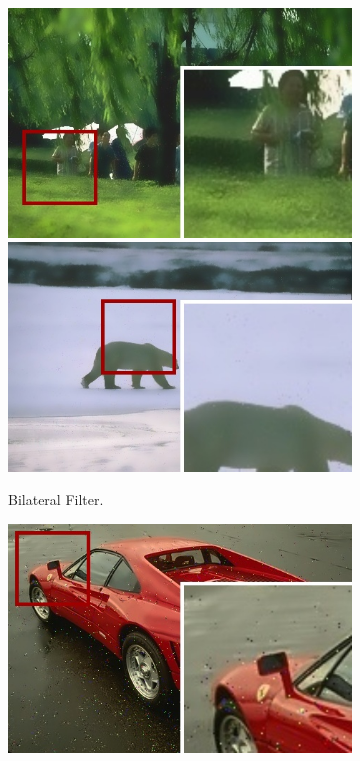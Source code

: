 \begin{figure}[!ht]
\begin{subfigure}[]{0.22\textwidth}
    \includegraphics[width=\textwidth]{./figures/sensor/berkeley/65033_bilateral_frame.jpg}\vspace{0.1cm}\\
    \includegraphics[width=\textwidth]{./figures/sensor/berkeley/100007_bilateral_frame.jpg}%
    \caption{Bilateral Filter.}
  \end{subfigure}\hfill
  \begin{subfigure}[]{0.22\textwidth}
    \centering
    \includegraphics[width=\textwidth]{./figures/sensor/berkeley/29030_nonlocalmeans_frame.jpg}\vspace{0.1cm}\\

\end{subfigure}
\end{figure}
